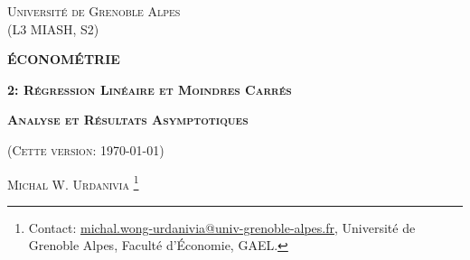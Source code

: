 \documentclass[10pt, reqno]{amsart}
\begin{document}
 
\usetikzlibrary{positioning}
\usetikzlibrary{snakes}
\usetikzlibrary{calc}
\usetikzlibrary{arrows}
\usetikzlibrary{decorations.markings}
\usetikzlibrary{shapes.misc}
\usetikzlibrary{shapes}

%

\begin{titlepage}
\centering
	{\scshape\Large \textsc{Université de Grenoble Alpes\\(L3 MIASH, S2)}\par}
	\vspace{0.5cm}
	{\Large\bfseries \scshape\Large \textsc{ÉCONOMÉTRIE}\par}
	\vspace{0.5cm}
	{\Large\bfseries \textsc{2: Régression Linéaire et Moindres Carrés} \par}
    \vspace{1cm}   
	{\Large\bfseries \textsc{Analyse et Résultats Asymptotiques} \par}
	\vspace{1cm}
	{(\textsc{Cette version: \today})\par}
	\vspace{1cm}
	{\large \textsc{Michal W. Urdanivia}
	\footnote{Contact:  
	\href{mailto:michal.wong-urdanivia@univ-grenoble-alpes.fr}{michal.wong-urdanivia@univ-grenoble-alpes.fr}, 
	 Université de Grenoble Alpes,  Faculté d'\'Economie, GAEL.}\par}
	
\end{titlepage}


\newpage

\tableofcontents

\newpage

\newpage

\tableofcontents

\newpage
\end{document}
